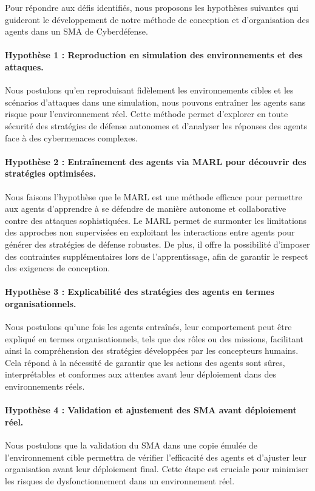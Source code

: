Pour répondre aux défis identifiés, nous proposons les hypothèses suivantes qui guideront le développement de notre méthode de conception et d'organisation des agents dans un SMA de Cyberdéfense.

\paragraph{Hypothèse 1 : Reproduction en simulation des environnements et des attaques.}
Nous postulons qu'en reproduisant fidèlement les environnements cibles et les scénarios d'attaques dans une simulation, nous pouvons entraîner les agents sans risque pour l'environnement réel. Cette méthode permet d'explorer en toute sécurité des stratégies de défense autonomes et d'analyser les réponses des agents face à des cybermenaces complexes.

\paragraph{Hypothèse 2 : Entraînement des agents via MARL pour découvrir des stratégies optimisées.}
Nous faisons l'hypothèse que le MARL est une méthode efficace pour permettre aux agents d'apprendre à se défendre de manière autonome et collaborative contre des attaques sophistiquées. Le MARL permet de surmonter les limitations des approches non supervisées en exploitant les interactions entre agents pour générer des stratégies de défense robustes. De plus, il offre la possibilité d'imposer des contraintes supplémentaires lors de l'apprentissage, afin de garantir le respect des exigences de conception.

\paragraph{Hypothèse 3 : Explicabilité des stratégies des agents en termes organisationnels.}
Nous postulons qu'une fois les agents entraînés, leur comportement peut être expliqué en termes organisationnels, tels que des rôles ou des missions, facilitant ainsi la compréhension des stratégies développées par les concepteurs humains. Cela répond à la nécessité de garantir que les actions des agents sont sûres, interprétables et conformes aux attentes avant leur déploiement dans des environnements réels.

\paragraph{Hypothèse 4 : Validation et ajustement des SMA avant déploiement réel.}
Nous postulons que la validation du SMA dans une copie émulée de l'environnement cible permettra de vérifier l'efficacité des agents et d'ajuster leur organisation avant leur déploiement final. Cette étape est cruciale pour minimiser les risques de dysfonctionnement dans un environnement réel.

